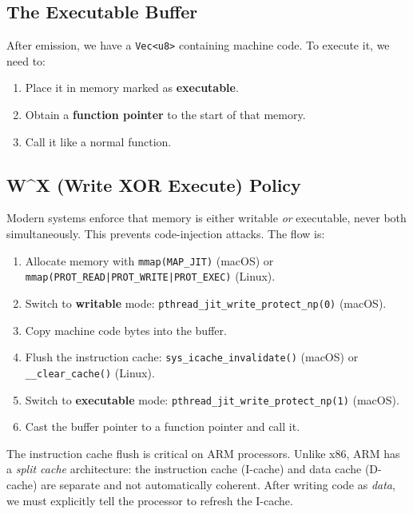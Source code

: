 \documentclass[11pt,letterpaper]{article}
\begin{document}
\subsection{The Executable Buffer}

After emission, we have a \texttt{Vec<u8>} containing machine code. To execute it, we need to:
\begin{enumerate}
    \item Place it in memory marked as \textbf{executable}.
    \item Obtain a \textbf{function pointer} to the start of that memory.
    \item Call it like a normal function.
\end{enumerate}

\subsection{W\^{}X (Write XOR Execute) Policy}

Modern systems enforce that memory is either writable \emph{or} executable, never both simultaneously. This prevents code-injection attacks. The flow is:

\begin{enumerate}
    \item Allocate memory with \texttt{mmap(MAP\_JIT)} (macOS) or \texttt{mmap(PROT\_READ|PROT\_WRITE|PROT\_EXEC)} (Linux).
    \item Switch to \textbf{writable} mode: \texttt{pthread\_jit\_write\_protect\_np(0)} (macOS).
    \item Copy machine code bytes into the buffer.
    \item Flush the instruction cache: \texttt{sys\_icache\_invalidate()} (macOS) or \texttt{\_\_clear\_cache()} (Linux).
    \item Switch to \textbf{executable} mode: \texttt{pthread\_jit\_write\_protect\_np(1)} (macOS).
    \item Cast the buffer pointer to a function pointer and call it.
\end{enumerate}

\begin{keyinsight}
The instruction cache flush is critical on ARM processors. Unlike x86, ARM has a \emph{split cache} architecture: the instruction cache (I-cache) and data cache (D-cache) are separate and not automatically coherent. After writing code as \emph{data}, we must explicitly tell the processor to refresh the I-cache.
\end{keyinsight}
\end{document}
